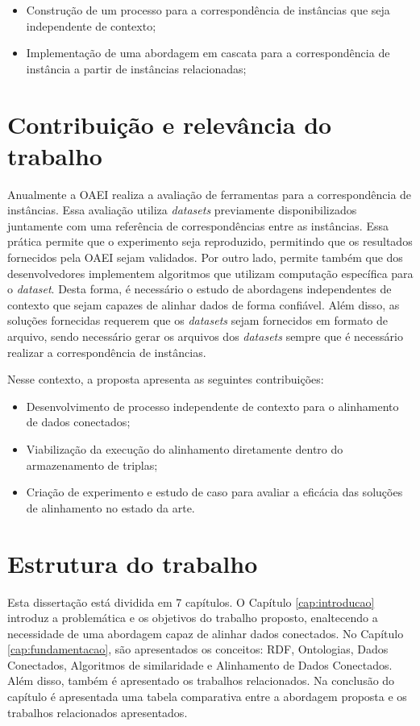 \begin{itemize}
        \item Construção de um processo para a correspondência de instâncias que seja independente de contexto;
        \item Implementação de uma abordagem em cascata para a correspondência de instância a partir de instâncias relacionadas;
\end{itemize}


\section{Contribuição e relevância do trabalho}
\label{contribuicao}
Anualmente a OAEI realiza a avaliação de ferramentas para a correspondência de instâncias. Essa avaliação utiliza \textit{datasets} previamente disponibilizados juntamente com uma referência de correspondências entre as instâncias. Essa prática permite que o experimento seja reproduzido, permitindo que os resultados fornecidos pela OAEI sejam validados. Por outro lado, permite também que dos desenvolvedores implementem algoritmos que utilizam computação específica para o \textit{dataset}. Desta forma, é necessário o estudo de abordagens independentes de contexto que sejam capazes de alinhar dados de forma confiável. Além disso, as soluções fornecidas requerem que os \textit{datasets} sejam fornecidos em formato de arquivo, sendo necessário gerar os arquivos dos \textit{datasets} sempre que é necessário realizar a correspondência de instâncias.

Nesse contexto, a proposta apresenta as seguintes contribuições:
\begin{itemize}
\item Desenvolvimento de processo independente de contexto para o alinhamento de dados conectados;
\item Viabilização da execução do alinhamento diretamente dentro do armazenamento de triplas;%
\item  Criação de experimento e estudo de caso para avaliar a eficácia das soluções de alinhamento no estado da arte.
\end{itemize}

\section{Estrutura do trabalho}

Esta dissertação está dividida em 7 capítulos. O Capítulo \ref{cap:introducao} introduz a problemática e os objetivos do trabalho proposto, enaltecendo a necessidade de uma abordagem capaz de alinhar dados conectados. No Capítulo \ref{cap:fundamentacao}, são apresentados os conceitos: RDF, Ontologias, Dados Conectados, Algoritmos de similaridade e Alinhamento de Dados Conectados. Além disso, também é apresentado os trabalhos relacionados. Na conclusão do capítulo é apresentada uma tabela comparativa entre a abordagem proposta e os trabalhos relacionados apresentados.

